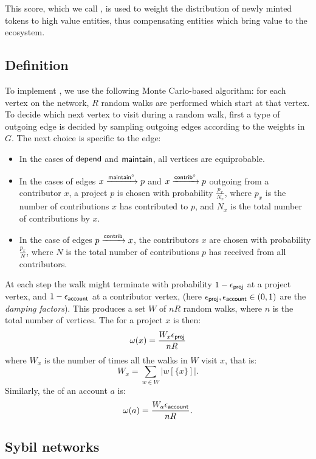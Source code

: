 This score, which we call \osrank{}, is used to weight the
distribution of newly minted tokens to high value entities, thus
compensating entities which bring value to the ecosystem.

\subsection{Definition}

To implement \osrank{}, we use the following Monte Carlo-based algorithm: for
each vertex on the network, $R$ random walks are performed which start at that
vertex. To decide which next vertex to visit during a random walk, first a type
of outgoing edge is decided by sampling outgoing edges according to the weights
in $G$. The next choice is specific to the edge:

\begin{itemize}
\item In the cases of $\mathsf{depend}$ and $\mathsf{maintain}$, all vertices are equiprobable.
\item In the cases of edges $x \xrightarrow[]{\mathsf{maintain}^\circ} p$ and
  $x \xrightarrow[]{\mathsf{contrib}^\circ} p$ outgoing from a contributor $x$, a project $p$ is
  chosen with probability $\frac{p_x}{N_x}$, where $p_x$ is the number of
  contributions $x$ has contributed to $p$, and $N_x$ is the total number of
  contributions by $x$.
\item In the case of edges $p \xrightarrow[]{\mathsf{contrib}} x$, the contributors $x$ are
  chosen with probability $\frac{p_x}{N}$, where $N$ is the total number of
  contributions $p$ has received from all contributors.
\end{itemize}

\noindent At each step the walk might terminate with probability $1 - \epsilon_{\mathsf{proj}}$ at a
project vertex, and $1 - \epsilon_{\mathsf{account}}$ at a contributor vertex, (here
$\epsilon_{\mathsf{proj}}, \epsilon_{\mathsf{account}} \in (0,1)$ are the \emph{damping factors}). This
produces a set $W$ of $nR$ random walks, where $n$ is the total number of
vertices. The \osrank{} for a project $x$ is then:
\[
  \omega(x) = \frac{W_x \epsilon_{\mathsf{proj}}}{n R}
\]
where $W_x$ is the number of times all the walks in $W$ visit $x$, that is:
\[
  W_x = \sum_{w \in W} |w[\{x\}]|.
\]
Similarly, the \osrank{} of an account $a$ is:
\[
  \omega(a) = \frac{W_a \epsilon_{\mathsf{account}}}{n R}.
\]

\subsection{Sybil networks}

